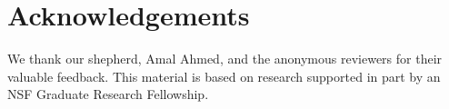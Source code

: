 \section*{Acknowledgements}

We thank our shepherd, Amal Ahmed, and the anonymous reviewers for their
valuable feedback. This material is based on research supported in part by an
NSF Graduate Research Fellowship.
